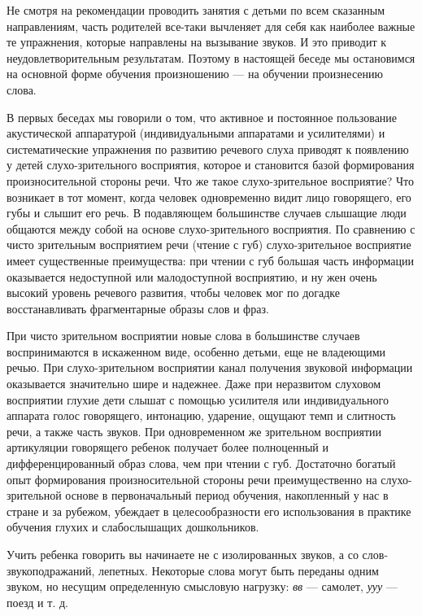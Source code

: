 \documentclass[a5paper]{book}
\renewcommand{\emph}[1]{\textit{#1}}
\begin{document}
Не смотря на рекомендации проводить занятия с детьми по всем сказанным
направлениям, часть родителей все-таки вычленяет для себя как наиболее
важные те упражнения, которые направлены на вызывание звуков. И это
приводит к неудовлетворительным результатам. Поэтому в настоящей беседе
мы остановимся на основной форме обучения произношению --- на обучении
произнесению слова.

В первых беседах мы говорили о том, что активное и постоянное
пользование акустической аппаратурой (индивидуальными аппаратами и
усилителями) и систематические упражнения по развитию речевого слуха
приводят к появлению у детей слухо-зрительного восприятия, которое и
становится базой формирования произносительной стороны речи. Что же
такое слухо-зрительное восприятие? Что возникает в тот момент, когда
человек одновременно видит лицо говорящего, его губы и слышит его речь.
В подавляющем большинстве случаев слышащие люди общаются между собой на
основе слухо-зрительного восприятия. По сравнению с чисто зрительным
восприятием речи (чтение с губ) слухо-зрительное восприятие имеет
существенные преимущества: при чтении с губ большая часть информации
оказывается недоступной или малодоступной восприятию, и ну жен очень
высокий уровень речевого развития, чтобы человек мог по догадке
восстанавливать фрагментарные образы слов и фраз.

При чисто зрительном восприятии новые слова в большинстве случаев
воспринимаются в искаженном виде, особенно детьми, еще не владеющими
речью. При слухо-зрительном восприятии канал получения звуковой
информации оказывается значительно шире и надежнее. Даже при неразвитом
слуховом восприятии глухие дети слышат с помощью усилителя или
индивидуального аппарата голос говорящего, интонацию, ударение, ощущают
темп и слитность речи, а также часть звуков. При одновременном же
зрительном восприятии артикуляции говорящего ребенок получает более
полноценный и дифференцированный образ слова, чем при чтении с губ.
Достаточно богатый опыт формирования произносительной стороны речи
преимущественно на слухо-зрительной основе в первоначальный период
обучения, накопленный у нас в стране и за рубежом, убеждает в
целесообразности его использования в практике обучения глухих и
слабослышащих дошкольников.

Учить ребенка говорить вы начинаете не с изолированных звуков, а со
слов-звукоподражаний, лепетных. Некоторые слова могут быть переданы
одним звуком, но несущим определенную смысловую нагрузку: \emph{вв} ---
самолет, \emph{ууу} --- поезд и т. д.
\end{document}
